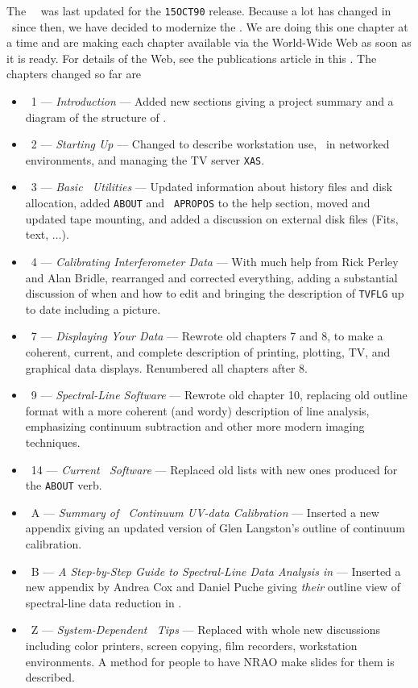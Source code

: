      The \AIPS\ \Cookbook\ was last updated for the {\tt 15OCT90}
release.  Because a lot has changed in \AIPS\ since then, we have
decided to modernize the \Cookbook.  We are doing this one chapter at
a time and are making each chapter available via the World-Wide Web as
soon as it is ready.  For details of the Web, see the publications
article in this \Aipsletter.  The chapters changed so far are
\vspace{-8pt}
\begin{itemize}
\item\ 1 --- {\it Introduction} --- Added new sections giving a
   project summary and a diagram of the structure of \AIPS.
\item\ 2 --- {\it Starting Up \AIPS} ---  Changed to describe
   workstation use, \AIPS\ in networked environments, and managing the
   TV server \hbox{{\tt XAS}}.
\item\ 3 --- {\it Basic \AIPS\ Utilities} --- Updated information about
   history files and disk allocation, added {\tt ABOUT} and {\tt
   APROPOS} to the help section, moved and updated tape mounting, and
   added a discussion on external disk files (Fits, text, $\ldots$).
\item\ 4 --- {\it Calibrating Interferometer Data} --- With much help
   from Rick Perley and Alan Bridle, rearranged and corrected
   everything, adding a substantial discussion of when and how to edit
   and bringing the description of {\tt TVFLG} up to date including a
   picture.
\item\ 7 --- {\it Displaying Your Data} --- Rewrote old chapters 7
   and 8, to make a coherent, current, and complete description of
   printing, plotting, TV, and graphical data displays.  Renumbered all
   chapters after 8.
\item\ 9 --- {\it Spectral-Line Software} --- Rewrote old chapter 10,
   replacing old outline format with a more coherent (and wordy)
   description of line analysis, emphasizing continuum subtraction and
   other more modern imaging techniques.
\item\ 14 --- {\it Current \AIPS\ Software} --- Replaced old lists with
   new ones produced for the {\tt ABOUT} verb.
\item\ A --- {\it Summary of \AIPS\ Continuum UV-data Calibration} ---
   Inserted a new appendix giving an updated version of Glen
   Langston's outline of continuum calibration.
\item\ B --- {\it A Step-by-Step Guide to Spectral-Line Data Analysis
   in \AIPS} --- Inserted a new appendix by Andrea Cox and Daniel
   Puche giving {\it their} outline view of spectral-line data
   reduction in \hbox{\AIPS}.
\item\ Z --- {\it System-Dependent \AIPS\ Tips} --- Replaced with whole
   new discussions including color printers, screen copying, film
   recorders, workstation environments.  A method for people to have
   NRAO make slides for them is described.
\end{itemize}
